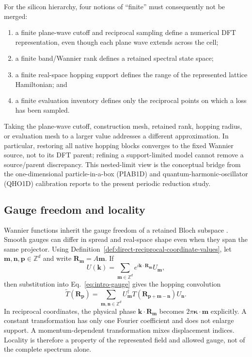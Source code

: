 \documentclass[11pt]{article}
\theoremstyle{definition}
\newcommand{\kvec}{\mathbf k}
\begin{document}
For the silicon hierarchy, four notions of ``finite'' must consequently not be merged:
\begin{enumerate}[leftmargin=2em]
 \item a finite plane-wave cutoff and reciprocal sampling define a numerical DFT
 representation, even though each plane wave extends across the cell;
 \item a finite band/Wannier rank defines a retained spectral state space;
 \item a finite real-space hopping support defines the range of the represented lattice
 Hamiltonian; and
 \item a finite evaluation inventory defines only the reciprocal points on which a loss
 has been sampled.
\end{enumerate}
Taking the plane-wave cutoff, construction mesh, retained rank, hopping radius, or
evaluation mesh to a larger value addresses a different approximation.  In particular,
restoring all native hopping blocks converges to the fixed Wannier source, not to its DFT
parent; refining a support-limited model cannot remove a source/parent discrepancy.
This nested-limit view is the conceptual bridge from the one-dimensional
particle-in-a-box (PIAB1D) and quantum-harmonic-oscillator (QHO1D) calibration reports
to the present periodic reduction study.

\subsection{Gauge freedom and locality}

Wannier functions inherit the gauge freedom of a retained Bloch subspace
\cite{marzari1997,souza2001,marzari2012}.  Smooth gauges can differ in spread and real-space
shape even when they span the same projector.  Using
Definition~\ref{def:direct-reciprocal-coordinate-values}, let
$\mathbf m,\mathbf n,\mathbf p\in\mathbb Z^d$ and write
$\mathbf R_{\mathbf m}=A\mathbf m$.  If
\begin{equation}
 U(\kvec)=\sum_{\mathbf m\in\mathbb Z^d}
 e^{i\kvec\cdot\mathbf R_{\mathbf m}}U_{\mathbf m},
 \label{eq:gauge-fourier-coefficients}
\end{equation}
then substitution into Eq.~\eqref{eq:intro-gauge} gives the hopping convolution
\begin{equation}
 \widetilde T(\mathbf R_{\mathbf p})
 =\sum_{\mathbf m,\mathbf n\in\mathbb Z^d}
 U_{\mathbf m}^\dagger
 T(\mathbf R_{\mathbf p+\mathbf m-\mathbf n})U_{\mathbf n}.
 \label{eq:hopping-convolution}
\end{equation}
In reciprocal coordinates, the physical phase
$\kvec\cdot\mathbf R_{\mathbf m}$ becomes
$2\pi\boldsymbol\kappa\cdot\mathbf m$ explicitly.
A constant transformation has only one Fourier coefficient and does not enlarge support.
A momentum-dependent transformation mixes displacement indices.  Locality is therefore
a property of the represented field and allowed gauge, not of the complete spectrum
alone.
\end{document}
